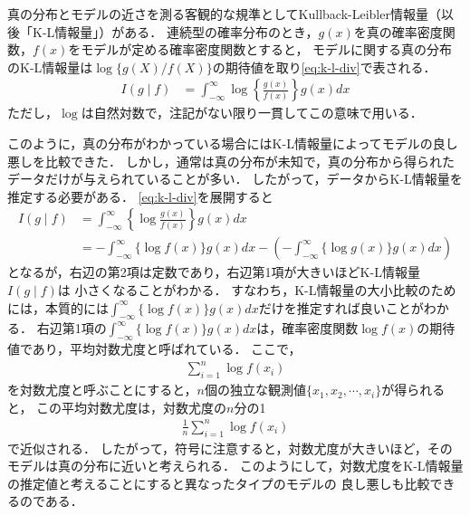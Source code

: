 真の分布とモデルの近さを測る客観的な規準としてKullback-Leibler情報量（以後「K-L情報量」）がある．
連続型の確率分布のとき，$g(x)$を真の確率密度関数，$f(x)$をモデルが定める確率密度関数とすると，
モデルに関する真の分布のK-L情報量は$\log\{g(X)/f(X)\}$の期待値を取り\eqref{eq:k-l-div}で表される．
\begin{align}
  \label{eq:k-l-div}
  I(g \mid f) &= \int^{\infty}_{-\infty}\log\left\{\frac{g(x)}{f(x)}\right\}g(x)dx
\end{align}
ただし，$\log$は自然対数で，注記がない限り一貫してこの意味で用いる．

このように，真の分布がわかっている場合にはK-L情報量によってモデルの良し悪しを比較できた．
しかし，通常は真の分布が未知で，真の分布から得られたデータだけが与えられていることが多い．
したがって，データからK-L情報量を推定する必要がある．
\eqref{eq:k-l-div}を展開すると
\begin{align}
  I(g \mid f) &= \int^{\infty}_{-\infty}\left\{\log\frac{g(x)}{f(x)}\right\}g(x)dx\\\nonumber
              &= -\int^{\infty}_{-\infty}\{\log f(x)\}g(x)dx - 
                 \left(-\int^{\infty}_{-\infty}\{\log g(x)\}g(x)dx\right)
\end{align}
となるが，右辺の第2項は定数であり，右辺第1項が大きいほどK-L情報量$I(g \mid f)$は
小さくなることがわかる．
すなわち，K-L情報量の大小比較のためには，本質的には$\int^{\infty}_{-\infty}\{\log f(x)\}g(x)dx$だけを推定すれば良いことがわかる．
右辺第1項の$\int^{\infty}_{-\infty}\{\log f(x)\}g(x)dx$は，確率密度関数$\log f(x)$の期待値であり，平均対数尤度と呼ばれている．
ここで，
\begin{align}
  \sum_{i=1}^{n}\log f(x_i)
\end{align}
を対数尤度と呼ぶことにすると，$n$個の独立な観測値$\{x_1, x_2, \cdots, x_i\}$が得られると，
この平均対数尤度は，対数尤度の$n$分の1
\begin{align}
  \frac{1}{n}\sum_{i=1}^{n}\log f(x_i)
\end{align}
で近似される．
したがって，符号に注意すると，対数尤度が大きいほど，そのモデルは真の分布に近いと考えられる．
このようにして，対数尤度をK-L情報量の推定値と考えることにすると異なったタイプのモデルの
良し悪しも比較できるのである．

